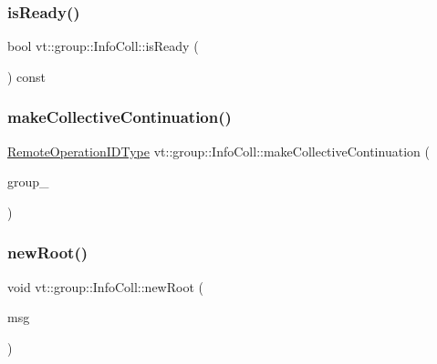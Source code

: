 \subsubsection{\texorpdfstring{is\+Ready()}{isReady()}}
{\footnotesize\ttfamily bool vt\+::group\+::\+Info\+Coll\+::is\+Ready (\begin{DoxyParamCaption}{ }\end{DoxyParamCaption}) const}

\mbox{\label{structvt_1_1group_1_1_info_coll_a1272a60bb7397d4434e16d6d02b7506e}} 
\subsubsection{\texorpdfstring{make\+Collective\+Continuation()}{makeCollectiveContinuation()}}
{\footnotesize\ttfamily \hyperlink{namespacevt_1_1group_a73f2624ddeb535b39a08b6524f26b244}{Remote\+Operation\+I\+D\+Type} vt\+::group\+::\+Info\+Coll\+::make\+Collective\+Continuation (\begin{DoxyParamCaption}\item[{\hyperlink{namespacevt_a27b5e4411c9b6140c49100e050e2f743}{Group\+Type} const}]{group\+\_\+ }\end{DoxyParamCaption})\hspace{0.3cm}{\ttfamily [private]}}

\mbox{\label{structvt_1_1group_1_1_info_coll_a9d6575ca76673103be0c4960c818a892}} 
\subsubsection{\texorpdfstring{new\+Root()}{newRoot()}}
{\footnotesize\ttfamily void vt\+::group\+::\+Info\+Coll\+::new\+Root (\begin{DoxyParamCaption}\item[{\hyperlink{namespacevt_1_1group_a4c1183efe0185992fefb3ab38a55a8a7}{Group\+Collective\+Msg} $\ast$}]{msg }\end{DoxyParamCaption})\hspace{0.3cm}{\ttfamily [private]}}

